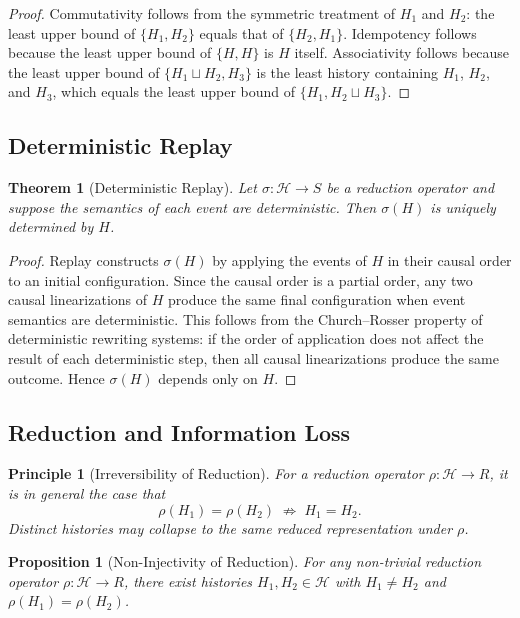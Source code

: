 \documentclass[12pt]{article}
\newtheorem{principle}{Principle}
\newtheorem{proposition}{Proposition}
\newtheorem{theorem}{Theorem}
\begin{document}
\begin{proof}
Commutativity follows from the symmetric treatment of $H_1$ and $H_2$: the least upper bound
of $\{H_1, H_2\}$ equals that of $\{H_2, H_1\}$. Idempotency follows because the least upper
bound of $\{H, H\}$ is $H$ itself. Associativity follows because the least upper bound of
$\{H_1 \sqcup H_2, H_3\}$ is the least history containing $H_1$, $H_2$, and $H_3$, which
equals the least upper bound of $\{H_1, H_2 \sqcup H_3\}$.
\end{proof}

\subsection{Deterministic Replay}

\begin{theorem}[Deterministic Replay]
\label{thm:replay}
Let $\sigma : \mathcal{H} \rightarrow S$ be a reduction operator and suppose the semantics of
each event are deterministic. Then $\sigma(H)$ is uniquely determined by $H$.
\end{theorem}

\begin{proof}
Replay constructs $\sigma(H)$ by applying the events of $H$ in their causal order to an
initial configuration. Since the causal order is a partial order, any two causal linearizations
of $H$ produce the same final configuration when event semantics are deterministic. This follows
from the Church--Rosser property of deterministic rewriting systems: if the order of application
does not affect the result of each deterministic step, then all causal linearizations produce
the same outcome. Hence $\sigma(H)$ depends only on $H$.
\end{proof}

\subsection{Reduction and Information Loss}

\begin{principle}[Irreversibility of Reduction]
For a reduction operator $\rho : \mathcal{H} \rightarrow R$, it is in general the case that
\[
\rho(H_1) = \rho(H_2) \;\not\Rightarrow\; H_1 = H_2.
\]
Distinct histories may collapse to the same reduced representation under $\rho$.
\end{principle}

\begin{proposition}[Non-Injectivity of Reduction]
For any non-trivial reduction operator $\rho : \mathcal{H} \rightarrow R$, there exist
histories $H_1, H_2 \in \mathcal{H}$ with $H_1 \neq H_2$ and $\rho(H_1) = \rho(H_2)$.
\end{proposition}
\end{document}
